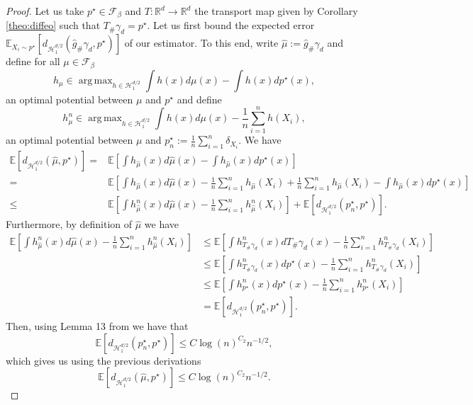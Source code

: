 \documentclass{article}
\DeclareMathOperator*{\argmax}{arg\,max}
\begin{document}
\begin{proof}
  Let us take $p^\star\in \mathcal{F}_\beta$ and $T:\mathbb{R}^d\rightarrow \mathbb{R}^d$ the transport map given by Corollary \ref{theo:diffeo} such that $T_{\# }\gamma_d=p^\star$. Let us first bound the expected error $\mathbb{E}_{X_i\sim p^\star}[d_{\mathcal{H}^{d/2}_1}(\hat{g}_{\# }\gamma_d,p^\star)]$ of our estimator. To this end, write $\hat{\mu}:=\hat{g}_{\# }\gamma_d$ and  define for all $\mu \in \mathcal{F}_\beta$
$$h_\mu \in \argmax_{h\in \mathcal{H}^{d/2}_1} \int h(x)d\mu(x)-\int h(x)dp^\star(x),$$
an optimal potential between $\mu$ and $p^\star$ and define
$$h_\mu^n \in \argmax_{h\in \mathcal{H}^{d/2}_1} \int h(x)d\mu(x)-\frac{1}{n}\sum_{i=1}^n h(X_i),$$
an optimal potential between $\mu$ and $p^\star_n:= \frac{1}{n}\sum_{i=1}^n \delta_{X_i}$. We have
\begin{align*}
    \mathbb{E}[d_{\mathcal{H}^{d/2}_1}(\hat{\mu},p^\star)] =& \mathbb{E}[\int h_{\hat{\mu}}(x)d\hat{\mu}(x)-\int h_{\hat{\mu}}(x)dp^\star(x)]\\
     = & \mathbb{E}[\int h_{\hat{\mu}}(x)d\hat{\mu}(x)-\frac{1}{n}\sum_{i=1}^n h_{\hat{\mu}}(X_i)+\frac{1}{n}\sum_{i=1}^n h_{\hat{\mu}}(X_i)-\int h_{\hat{\mu}}(x)dp^\star(x)]\\
     \leq & \mathbb{E}[\int h_{\hat{\mu}}^n(x)d\hat{\mu}(x)-\frac{1}{n}\sum_{i=1}^n h_{\hat{\mu}}^n(X_i)]+\mathbb{E}[d_{\mathcal{H}^{d/2}_1}(p^\star_n,p^\star)].
\end{align*}
Furthermore, by definition of $\hat{\mu}$ we have 
\begin{align*}
    \mathbb{E}[\int h_{\hat{\mu}}^n(x)d\hat{\mu}(x)-\frac{1}{n}\sum_{i=1}^n h_{\hat{\mu}}^n(X_i)]& \leq \mathbb{E}[\int h_{T_{\# }\gamma_d}^n(x)dT_{\# }\gamma_d(x)-\frac{1}{n}\sum_{i=1}^n h_{T_{\# }\gamma_d}^n(X_i)] \\
        & \leq \mathbb{E}[\int h_{T_{\# }\gamma_d}^n(x)d p^\star(x)-\frac{1}{n}\sum_{i=1}^n h_{T_{\# }\gamma_d}^n(X_i)] \\
    & \leq \mathbb{E}[\int h_{p ^\star}^n(x)dp^\star(x)-\frac{1}{n}\sum_{i=1}^n h_{p^\star}^n(X_i)]\\
    & = \mathbb{E}[d_{\mathcal{H}^{d/2}_1}(p^\star_n,p^\star)].
\end{align*}
Then, using Lemma 13 from \cite{tang2023minimax}
 we have that 
 $$\mathbb{E}[d_{\mathcal{H}^{d/2}_1}(p^\star_n,p^\star)]\leq C\log(n)^{C_2}n^{-1/2},$$
 which gives us using the previous derivations
 $$\mathbb{E}[d_{\mathcal{H}^{d/2}_1}(\hat{\mu},p^\star)] \leq C\log(n)^{C_2}n^{-1/2}.$$


\end{proof}
\end{document}
